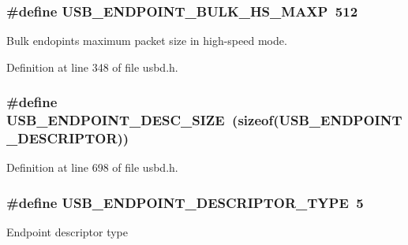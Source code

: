 \subsubsection[{\texorpdfstring{U\+S\+B\+\_\+\+E\+N\+D\+P\+O\+I\+N\+T\+\_\+\+B\+U\+L\+K\+\_\+\+H\+S\+\_\+\+M\+A\+XP}{USB_ENDPOINT_BULK_HS_MAXP}}]{\setlength{\rightskip}{0pt plus 5cm}\#define U\+S\+B\+\_\+\+E\+N\+D\+P\+O\+I\+N\+T\+\_\+\+B\+U\+L\+K\+\_\+\+H\+S\+\_\+\+M\+A\+XP~512}\hypertarget{group__USBD__Core_gad4839d37e7a31a4d9e8ddf242b16608f}{}\label{group__USBD__Core_gad4839d37e7a31a4d9e8ddf242b16608f}
Bulk endopint\textquotesingle{}s maximum packet size in high-\/speed mode. 

Definition at line 348 of file usbd.\+h.

\subsubsection[{\texorpdfstring{U\+S\+B\+\_\+\+E\+N\+D\+P\+O\+I\+N\+T\+\_\+\+D\+E\+S\+C\+\_\+\+S\+I\+ZE}{USB_ENDPOINT_DESC_SIZE}}]{\setlength{\rightskip}{0pt plus 5cm}\#define U\+S\+B\+\_\+\+E\+N\+D\+P\+O\+I\+N\+T\+\_\+\+D\+E\+S\+C\+\_\+\+S\+I\+ZE~(sizeof({\bf U\+S\+B\+\_\+\+E\+N\+D\+P\+O\+I\+N\+T\+\_\+\+D\+E\+S\+C\+R\+I\+P\+T\+OR}))}\hypertarget{group__USBD__Core_ga317f2697db907bff3f818a644d231c08}{}\label{group__USBD__Core_ga317f2697db907bff3f818a644d231c08}


Definition at line 698 of file usbd.\+h.

\subsubsection[{\texorpdfstring{U\+S\+B\+\_\+\+E\+N\+D\+P\+O\+I\+N\+T\+\_\+\+D\+E\+S\+C\+R\+I\+P\+T\+O\+R\+\_\+\+T\+Y\+PE}{USB_ENDPOINT_DESCRIPTOR_TYPE}}]{\setlength{\rightskip}{0pt plus 5cm}\#define U\+S\+B\+\_\+\+E\+N\+D\+P\+O\+I\+N\+T\+\_\+\+D\+E\+S\+C\+R\+I\+P\+T\+O\+R\+\_\+\+T\+Y\+PE~5}\hypertarget{group__USBD__Core_ga4e8d6d81a224f8b511edc92b6cb4e085}{}\label{group__USBD__Core_ga4e8d6d81a224f8b511edc92b6cb4e085}
Endpoint descriptor type 

